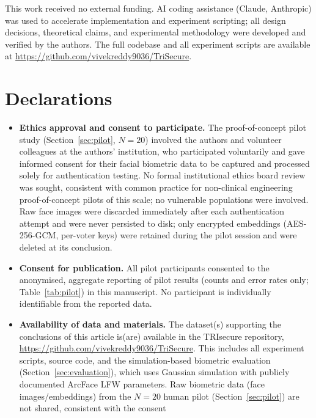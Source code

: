 \documentclass[pdflatex,sn-vancouver-num]{sn-jnl}%
\theoremstyle{thmstyleone}%
\theoremstyle{thmstyletwo}%
\theoremstyle{thmstylethree}%
\begin{document}
\backmatter


This work received no external funding. AI coding assistance (Claude,
Anthropic) was used to accelerate implementation and experiment scripting; all
design decisions, theoretical claims, and experimental methodology were
developed and verified by the authors. The full codebase and all experiment
scripts are available at \url{https://github.com/vivekreddy9036/TriSecure}.

\section*{Declarations}

\begin{itemize}
\item \textbf{Ethics approval and consent to participate.} The proof-of-concept
  pilot study (Section~\ref{sec:pilot}, \(N{=}20\)) involved the authors and
  volunteer colleagues at the authors' institution, who participated
  voluntarily and gave informed consent for their facial biometric data to
  be captured and processed solely for authentication testing. No formal
  institutional ethics board review was sought, consistent with common
  practice for non-clinical engineering proof-of-concept pilots of this
  scale; no vulnerable populations were involved. Raw face images were
  discarded immediately after each authentication attempt and were never
  persisted to disk; only encrypted embeddings (AES-256-GCM, per-voter
  keys) were retained during the pilot session and were deleted at its
  conclusion.
\item \textbf{Consent for publication.} All pilot participants consented to
  the anonymised, aggregate reporting of pilot results (counts and error
  rates only; Table~\ref{tab:pilot}) in this manuscript. No participant is
  individually identifiable from the reported data.
\item \textbf{Availability of data and materials.} The dataset(s) supporting
  the conclusions of this article is(are) available in the TRIsecure
  repository, \url{https://github.com/vivekreddy9036/TriSecure}. This
  includes all experiment scripts, source code, and the simulation-based
  biometric evaluation (Section~\ref{sec:evaluation}), which uses Gaussian
  simulation with publicly documented ArcFace LFW parameters. Raw biometric
  data (face images/embeddings) from the \(N{=}20\) human pilot
  (Section~\ref{sec:pilot}) are not shared, consistent with the consent

\end{itemize}
\end{document}
